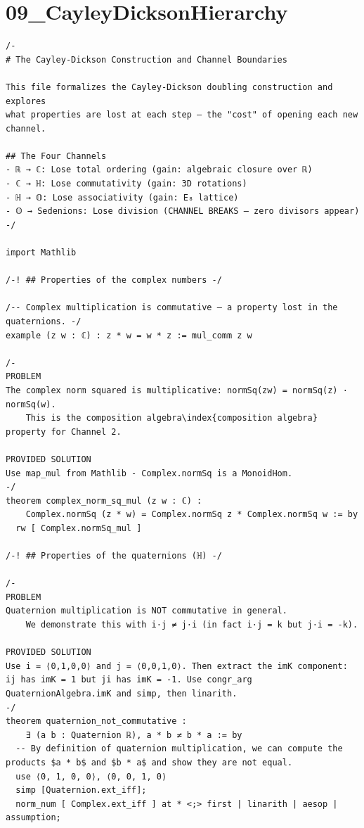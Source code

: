 \documentclass[11pt,openany]{book}
\theoremstyle{definition}
\theoremstyle{plain}
\theoremstyle{remark}
\begin{document}
\clearpage

\section*{09\_CayleyDicksonHierarchy}

\begin{lstlisting}[style=lean]
/-
# The Cayley-Dickson Construction and Channel Boundaries

This file formalizes the Cayley-Dickson doubling construction and explores
what properties are lost at each step — the "cost" of opening each new channel.

## The Four Channels
- ℝ → ℂ: Lose total ordering (gain: algebraic closure over ℝ)
- ℂ → ℍ: Lose commutativity (gain: 3D rotations)
- ℍ → 𝕆: Lose associativity (gain: E₈ lattice)
- 𝕆 → Sedenions: Lose division (CHANNEL BREAKS — zero divisors appear)
-/

import Mathlib

/-! ## Properties of the complex numbers -/

/-- Complex multiplication is commutative — a property lost in the quaternions. -/
example (z w : ℂ) : z * w = w * z := mul_comm z w

/-
PROBLEM
The complex norm squared is multiplicative: normSq(zw) = normSq(z) · normSq(w).
    This is the composition algebra\index{composition algebra} property for Channel 2.

PROVIDED SOLUTION
Use map_mul from Mathlib - Complex.normSq is a MonoidHom.
-/
theorem complex_norm_sq_mul (z w : ℂ) :
    Complex.normSq (z * w) = Complex.normSq z * Complex.normSq w := by
  rw [ Complex.normSq_mul ]

/-! ## Properties of the quaternions (ℍ) -/

/-
PROBLEM
Quaternion multiplication is NOT commutative in general.
    We demonstrate this with i·j ≠ j·i (in fact i·j = k but j·i = -k).

PROVIDED SOLUTION
Use i = ⟨0,1,0,0⟩ and j = ⟨0,0,1,0⟩. Then extract the imK component: ij has imK = 1 but ji has imK = -1. Use congr_arg QuaternionAlgebra.imK and simp, then linarith.
-/
theorem quaternion_not_commutative :
    ∃ (a b : Quaternion ℝ), a * b ≠ b * a := by
  -- By definition of quaternion multiplication, we can compute the products $a * b$ and $b * a$ and show they are not equal.
  use ⟨0, 1, 0, 0⟩, ⟨0, 0, 1, 0⟩
  simp [Quaternion.ext_iff];
  norm_num [ Complex.ext_iff ] at * <;> first | linarith | aesop | assumption;


\end{lstlisting}
\end{document}
